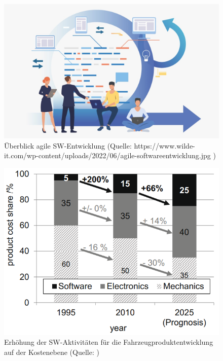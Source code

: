\begin{figure}[htb]
	\centering
	\includegraphics[width=\textwidth]{img/agile_overview.png}
	\caption[Überblick agile SW-Entwicklung (Quelle: https://www.wilde-it.com/wp-content/uploads/2022/06/agile-softwareentwicklung.jpg
	)]{Überblick agile SW-Entwicklung (Quelle: https://www.wilde-it.com/wp-content/uploads/2022/06/agile-softwareentwicklung.jpg
	)}
	\label{fig:overviewAgile}
\end{figure}

\begin{figure}[htb]
	\centering
	\includegraphics[width=\textwidth]{img/sw-activities-costs.png}
	\caption[Erhöhung der SW-Aktivitäten für die Fahrzeugproduktentwicklung auf der Kostenebene (Quelle: \cite{Schlosser2016})]{Erhöhung der SW-Aktivitäten für die Fahrzeugproduktentwicklung auf der Kostenebene (Quelle: \cite{Schlosser2016})}
	\label{fig:swSosts}
\end{figure}

